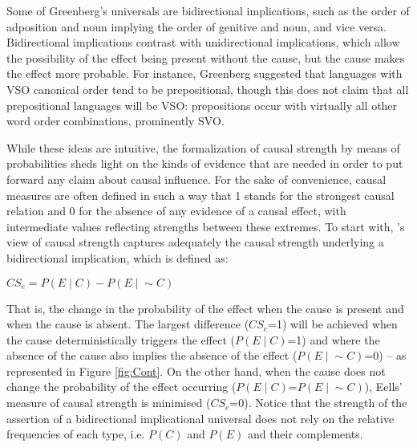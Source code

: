 \documentclass[output=paper]{langsci/langscibook}
\begin{document}
   Some of Greenberg's universals are bidirectional implications, such as the order of adposition and noun implying the order of genitive and noun, and vice versa.  Bidirectional implications contrast with unidirectional implications, which allow the possibility of the effect being present without the cause, but the cause makes the effect more probable. For instance, Greenberg suggested that languages with VSO canonical order tend to be prepositional, though this does not claim that all prepositional languages will be VSO: prepositions occur with virtually all other word order combinations, prominently SVO.  

\largerpage
While these ideas are intuitive, the formalization of causal strength by means of probabilities sheds light on the kinds of evidence that are needed in order to put forward any claim about causal influence.  For the sake of convenience, causal measures are often defined in such a way that 1 stands for the strongest causal relation and 0 for the absence of any evidence of a causal effect, with intermediate values reflecting strengths between these extremes. To start with, \cite{eells1991probabilistic}'s view of causal strength captures adequately the causal strength underlying a bidirectional implication, which is defined as:
 
\ea
$CS_e = P(E{\mid}{}C) - P(E{\mid}{}{\sim}C)$
\z

 That is, the change in the probability of the effect when the cause is present and when the cause is absent. The largest difference ($CS_e$=1) will be achieved when the cause deterministically triggers the effect ($P(E{\mid}{}C)$=1) and where the absence of the cause also implies the absence of the effect ($P(E{\mid}{}{\sim}C)$=0) -- as represented in Figure \ref{fig:Cont}. On the other hand, when the cause does not change the probability of the effect occurring ($P(E{\mid}{}C)$=$P(E{\mid}{}{\sim}C)$), Eells' measure of causal strength is minimised ($CS_e$=0). Notice that the strength of the assertion of a bidirectional implicational universal does not rely on the relative frequencies of each type, i.e. $P(C)$ and $P(E)$ and their complements. 
\end{document}
